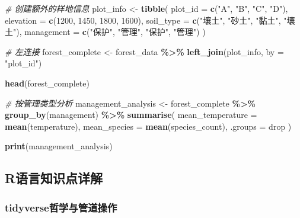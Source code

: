 \documentclass[
  twoside]{book}
\newenvironment{Shaded}{\begin{snugshade}}{\end{snugshade}}
\newcommand{\AttributeTok}[1]{\textcolor[rgb]{0.13,0.29,0.53}{#1}}
\newcommand{\CommentTok}[1]{\textcolor[rgb]{0.56,0.35,0.01}{\textit{#1}}}
\newcommand{\DecValTok}[1]{\textcolor[rgb]{0.00,0.00,0.81}{#1}}
\newcommand{\FunctionTok}[1]{\textcolor[rgb]{0.13,0.29,0.53}{\textbf{#1}}}
\newcommand{\NormalTok}[1]{#1}
\newcommand{\OtherTok}[1]{\textcolor[rgb]{0.56,0.35,0.01}{#1}}
\newcommand{\SpecialCharTok}[1]{\textcolor[rgb]{0.81,0.36,0.00}{\textbf{#1}}}
\newcommand{\StringTok}[1]{\textcolor[rgb]{0.31,0.60,0.02}{#1}}
\begin{document}
\begin{Shaded}
\begin{Highlighting}[]
\CommentTok{\# 创建额外的样地信息}
\NormalTok{plot\_info }\OtherTok{\textless{}{-}} \FunctionTok{tibble}\NormalTok{(}
  \AttributeTok{plot\_id =} \FunctionTok{c}\NormalTok{(}\StringTok{"A"}\NormalTok{, }\StringTok{"B"}\NormalTok{, }\StringTok{"C"}\NormalTok{, }\StringTok{"D"}\NormalTok{),}
  \AttributeTok{elevation =} \FunctionTok{c}\NormalTok{(}\DecValTok{1200}\NormalTok{, }\DecValTok{1450}\NormalTok{, }\DecValTok{1800}\NormalTok{, }\DecValTok{1600}\NormalTok{),}
  \AttributeTok{soil\_type =} \FunctionTok{c}\NormalTok{(}\StringTok{"壤土"}\NormalTok{, }\StringTok{"砂土"}\NormalTok{, }\StringTok{"黏土"}\NormalTok{, }\StringTok{"壤土"}\NormalTok{),}
  \AttributeTok{management =} \FunctionTok{c}\NormalTok{(}\StringTok{"保护"}\NormalTok{, }\StringTok{"管理"}\NormalTok{, }\StringTok{"保护"}\NormalTok{, }\StringTok{"管理"}\NormalTok{)}
\NormalTok{)}

\CommentTok{\# 左连接}
\NormalTok{forest\_complete }\OtherTok{\textless{}{-}}\NormalTok{ forest\_data }\SpecialCharTok{\%\textgreater{}\%}
  \FunctionTok{left\_join}\NormalTok{(plot\_info, }\AttributeTok{by =} \StringTok{"plot\_id"}\NormalTok{)}

\FunctionTok{head}\NormalTok{(forest\_complete)}

\CommentTok{\# 按管理类型分析}
\NormalTok{management\_analysis }\OtherTok{\textless{}{-}}\NormalTok{ forest\_complete }\SpecialCharTok{\%\textgreater{}\%}
  \FunctionTok{group\_by}\NormalTok{(management) }\SpecialCharTok{\%\textgreater{}\%}
  \FunctionTok{summarise}\NormalTok{(}
    \AttributeTok{mean\_temperature =} \FunctionTok{mean}\NormalTok{(temperature),}
    \AttributeTok{mean\_species =} \FunctionTok{mean}\NormalTok{(species\_count),}
    \AttributeTok{.groups =} \StringTok{\textquotesingle{}drop\textquotesingle{}}
\NormalTok{  )}

\FunctionTok{print}\NormalTok{(management\_analysis)}
\end{Highlighting}
\end{Shaded}

\hypertarget{rux8bedux8a00ux77e5ux8bc6ux70b9ux8be6ux89e3-8}{%
\subsection{R语言知识点详解}\label{rux8bedux8a00ux77e5ux8bc6ux70b9ux8be6ux89e3-8}}

\hypertarget{tidyverseux54f2ux5b66ux4e0eux7ba1ux9053ux64cdux4f5c}{%
\subsubsection{tidyverse哲学与管道操作}\label{tidyverseux54f2ux5b66ux4e0eux7ba1ux9053ux64cdux4f5c}}
\end{document}
